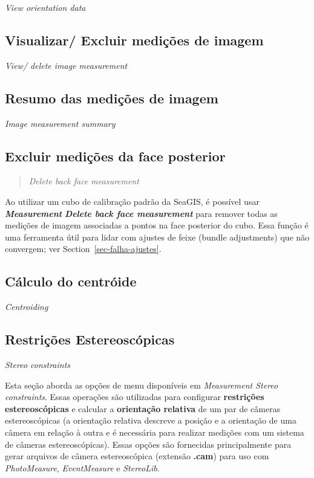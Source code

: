 \documentclass[
  12pt,
  letterpaper,
  DIV=11,
  numbers=noendperiod]{scrreprt}
\begin{document}
\emph{View orientation data}

\subsection{Visualizar/ Excluir medições de
imagem}\label{visualizar-excluir-mediuxe7uxf5es-de-imagem}

\emph{View/ delete image measurement}

\subsection{Resumo das medições de
imagem}\label{resumo-das-mediuxe7uxf5es-de-imagem}

\emph{Image measurement summary}

\subsection{Excluir medições da face
posterior}\label{excluir-mediuxe7uxf5es-da-face-posterior}

\begin{quote}
\emph{Delete back face measurement}
\end{quote}

Ao utilizar um cubo de calibração padrão da SeaGIS, é possível usar
\textbf{\emph{Measurement}} \textbf{\textbar{} \emph{Delete back face
measurement}} para remover todas as medições de imagem associadas a
pontos na face posterior do cubo. Essa função é uma ferramenta útil para
lidar com ajustes de feixe (bundle adjustments) que não convergem; ver
Section~\ref{sec-falha-ajustes}.

\subsection{Cálculo do centróide}\label{cuxe1lculo-do-centruxf3ide}

\emph{Centroiding}

\subsection{Restrições
Estereoscópicas}\label{restriuxe7uxf5es-estereoscuxf3picas}

\emph{Stereo constraints}

Esta seção aborda as opções de menu disponíveis em \emph{Measurement
\textbar{} Stereo constraints}. Essas operações são utilizadas para
configurar \textbf{restrições estereoscópicas} e calcular a
\textbf{orientação relativa} de um par de câmeras estereoscópicas (a
orientação relativa descreve a posição e a orientação de uma câmera em
relação à outra e é necessária para realizar medições com um sistema de
câmeras estereoscópicas). Essas opções são fornecidas principalmente
para gerar arquivos de câmera estereoscópica (extensão \textbf{.cam})
para uso com \emph{PhotoMeasure}, \emph{EventMeasure} e
\emph{StereoLib}.
\end{document}
